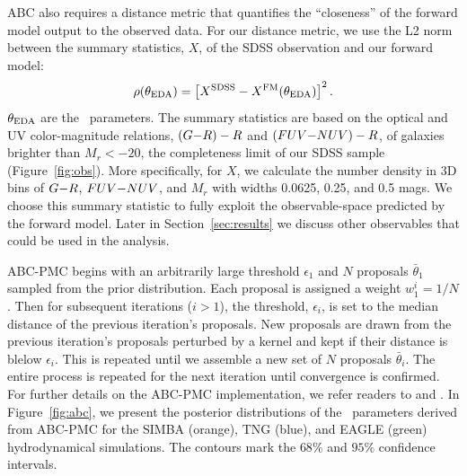 ABC also requires a distance metric that quantifies the ``closeness'' of the
forward model output to the observed data. For our distance metric, we use the
L2 norm between the summary statistics, $X$, of the SDSS observation and our 
forward model: 
\begin{equation} \label{eq:distance}
    \rho(\theta_{\rm \eda}) = \left[X^{\rm SDSS} - X^{\rm FM}(\theta_{\rm
    \eda}) \right]^2.
\end{equation}
$\theta_{\rm EDA}$ are the \eda~parameters. 
The summary statistics are based on the optical and UV color-magnitude
relations, $(G{-}R)-R$ and $(FUV{-}NUV)-R$, of galaxies brighter than $M_r < -20$,
the completeness limit of our SDSS sample (Figure~\ref{fig:obs}).
More specifically, for $X$, we calculate the number density in 3D bins of $G{-}R$,
$FUV{-}NUV$, and $M_r$ with widths 0.0625, 0.25, and 0.5 mags. We choose this summary 
statistic to fully exploit the observable-space predicted by the forward model. 
Later in Section~\ref{sec:results} we discuss other observables that could be
used in the analysis. 

ABC-PMC begins with an arbitrarily large threshold $\epsilon_1$ and $N$ proposals 
$\bar{\theta}_1$ sampled from the prior distribution. Each proposal is
assigned a weight $w^i_1 = 1/N$. Then for subsequent iterations ($i > 1$), the 
threshold, $\epsilon_i$, is set to the median distance of the previous iteration's
proposals. New proposals are drawn from the previous iteration's proposals perturbed 
by a kernel and kept if their distance is blelow $\epsilon_i$. This is repeated
until we assemble a new set of $N$ proposals $\bar{\theta}_i$. The entire
process is repeated for the next iteration until convergence is confirmed. For 
further details on the ABC-PMC implementation, we refer readers to \cite{hahn2017b}
and \cite{hahn2019a}.
In Figure~\ref{fig:abc}, we present the posterior distributions of the \eda~parameters
derived from ABC-PMC for the SIMBA (orange), TNG (blue), and EAGLE (green) hydrodynamical 
simulations. The contours mark the $68\%$ and $95\%$ confidence intervals. 

